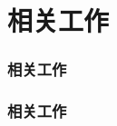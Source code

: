 \section{相关工作}

\begin{frame}
  \frametitle{相关工作}
\end{frame}

\begin{frame}
  \frametitle{相关工作}
\end{frame}
